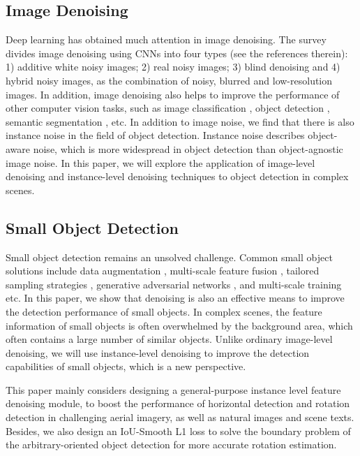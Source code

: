 \documentclass[10pt,journal,compsoc]{IEEEtran}
\begin{document}
\subsection{Image Denoising}
Deep learning has obtained much attention in image denoising. The survey \cite{tian2020deep} divides image denoising using CNNs into four types (see the references therein): 1) additive white noisy images; 2) real noisy images; 3) blind denoising and 4) hybrid noisy images, as the combination of noisy, blurred and low-resolution images. In addition, image denoising also helps to improve the performance of other computer vision tasks, such as image classification \cite{xie2019feature}, object detection \cite{milani2012adaptive}, semantic segmentation \cite{cho2020dapas}, etc. In addition to image noise, we find that there is also instance noise in the field of object detection. Instance noise describes object-aware noise, which is more widespread in object detection than object-agnostic image noise. In this paper, we will explore the application of image-level denoising and instance-level denoising techniques to object detection in complex scenes.

\subsection{Small Object Detection}
Small object detection remains an unsolved challenge. Common small object solutions include data augmentation \cite{kisantal2019augmentation}, multi-scale feature fusion \cite{lin2017feature, deng2021extended}, tailored sampling strategies \cite{zhu2018seeing, liu2020hambox, yang2019scrdet}, generative adversarial networks \cite{li2017perceptual}, and multi-scale training \cite{singh2018sniper} etc. In this paper, we show that denoising is also an effective means to improve the detection performance of small objects. In complex scenes, the feature information of small objects is often overwhelmed by the background area, which often contains a large number of similar objects. Unlike ordinary image-level denoising, we will use instance-level denoising to improve the detection capabilities of small objects, which is a new perspective.

This paper mainly considers designing a general-purpose instance level feature denoising module, to boost the performance of horizontal detection and rotation detection in challenging aerial imagery, as well as natural images and scene texts. Besides, we also design an IoU-Smooth L1 loss to solve the boundary problem of the arbitrary-oriented object detection for more accurate rotation estimation.
\end{document}
